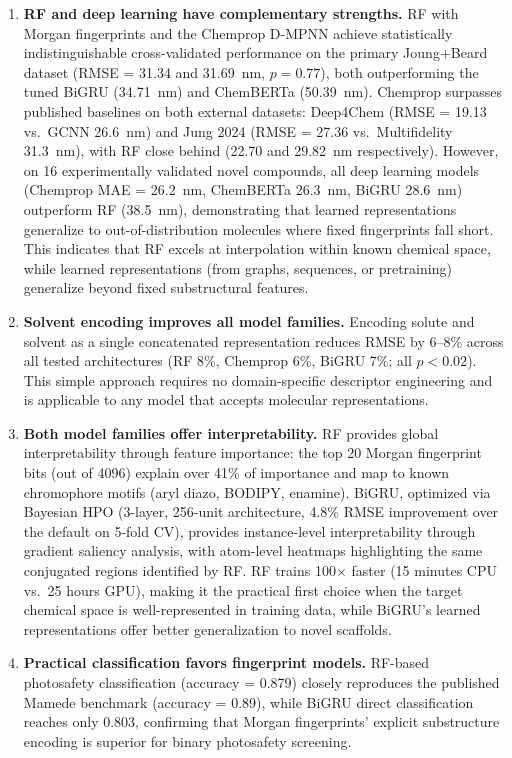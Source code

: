 \begin{enumerate}
    \item \textbf{RF and deep learning have complementary strengths.}
    RF with Morgan fingerprints and the Chemprop D-MPNN achieve statistically indistinguishable cross-validated performance on the primary Joung+Beard dataset (RMSE = 31.34 and 31.69~nm, $p = 0.77$), both outperforming the tuned BiGRU (34.71~nm) and ChemBERTa (50.39~nm). Chemprop surpasses published baselines on both external datasets: Deep4Chem (RMSE = 19.13 vs.\ GCNN 26.6~nm\cite{joung2021deep}) and Jung 2024 (RMSE = 27.36 vs.\ Multifidelity 31.3~nm), with RF close behind (22.70 and 29.82~nm respectively).
    However, on 16 experimentally validated novel compounds, all deep learning models (Chemprop MAE = 26.2~nm, ChemBERTa 26.3~nm, BiGRU 28.6~nm) outperform RF (38.5~nm), demonstrating that learned representations generalize to out-of-distribution molecules where fixed fingerprints fall short.
    This indicates that RF excels at interpolation within known chemical space, while learned representations (from graphs, sequences, or pretraining) generalize beyond fixed substructural features.

    \item \textbf{Solvent encoding improves all model families.}
    Encoding solute and solvent as a single concatenated representation reduces RMSE by 6--8\% across all tested architectures (RF 8\%, Chemprop 6\%, BiGRU 7\%; all $p < 0.02$).
    This simple approach requires no domain-specific descriptor engineering and is applicable to any model that accepts molecular representations.

    \item \textbf{Both model families offer interpretability.}
    RF provides global interpretability through feature importance: the top 20 Morgan fingerprint bits (out of 4096) explain over 41\% of importance and map to known chromophore motifs (aryl diazo, BODIPY, enamine).
    BiGRU, optimized via Bayesian HPO (3-layer, 256-unit architecture, 4.8\% RMSE improvement over the default on 5-fold CV), provides instance-level interpretability through gradient saliency analysis, with atom-level heatmaps highlighting the same conjugated regions identified by RF.
    RF trains 100$\times$ faster (15 minutes CPU vs.\ 25 hours GPU), making it the practical first choice when the target chemical space is well-represented in training data, while BiGRU's learned representations offer better generalization to novel scaffolds.

    \item \textbf{Practical classification favors fingerprint models.}
    RF-based photosafety classification (accuracy = 0.879) closely reproduces the published Mamede benchmark (accuracy = 0.89), while BiGRU direct classification reaches only 0.803, confirming that Morgan fingerprints' explicit substructure encoding is superior for binary photosafety screening.
\end{enumerate}

